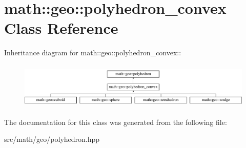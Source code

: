 \hypertarget{classmath_1_1geo_1_1polyhedron__convex}{
\section{math::geo::polyhedron\_\-convex Class Reference}
\label{classmath_1_1geo_1_1polyhedron__convex}
}
Inheritance diagram for math::geo::polyhedron\_\-convex::\begin{figure}[H]
\begin{center}
\leavevmode
\includegraphics[height=2.19895cm]{classmath_1_1geo_1_1polyhedron__convex}
\end{center}
\end{figure}


The documentation for this class was generated from the following file:\begin{DoxyCompactItemize}
\item 
src/math/geo/polyhedron.hpp\end{DoxyCompactItemize}
